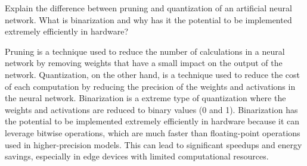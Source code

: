 \begin{ejercicio}
    Explain the difference between pruning and quantization of an artificial neural network. What is binarization and why has it the potential to be implemented extremely efficiently in hardware?
    
    Pruning is a technique used to reduce the number of calculations in a neural network by removing weights that have a small impact on the output of the network. Quantization, on the other hand, is a technique used to reduce the cost of each computation by reducing the precision of the weights and activations in the neural network. Binarization is a extreme type of quantization where the weights and activations are reduced to binary values (0 and 1). Binarization has the potential to be implemented extremely efficiently in hardware because it can leverage bitwise operations, which are much faster than floating-point operations used in higher-precision models. This can lead to significant speedups and energy savings, especially in edge devices with limited computational resources.
\end{ejercicio}